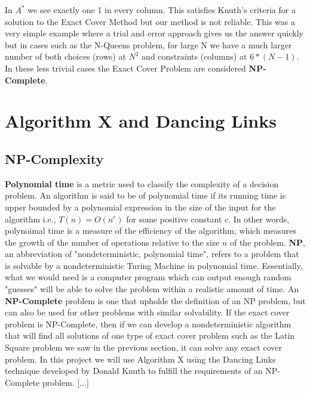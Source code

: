 \documentclass{article}
\begin{document}
In $A^*$ we see exactly one 1 in every column. This satisfies Knuth's criteria for a solution to the Exact Cover Method but our method is not reliable. This was a very simple example where a trial and error approach gives us the answer quickly but in cases such as the N-Queens problem, for large N we have a much larger number of both choices (rows) at $N^2$ and constraints (columns) at $6*(N-1)$. In these less trivial cases the Exact Cover Problem are considered \textbf{NP-Complete}.\\

\clearpage
\section{Algorithm X and Dancing Links}
\subsection{NP-Complexity}
\textbf{Polynomial time} is a metric used to classify the complexity of a decision problem. An algorithm is said to be of polynomial time if its running time is upper bounded by a polynomial expression in the size of the input for the algorithm i.e., $T(n) = O(n^c)$ for some positive constant $c$. In other words, polynoimal time is a measure of the efficiency of the algorithm, which measures the growth of the number of operations relative to the size $n$ of the problem. \textbf{NP}, an abbreviation of "nondeterministic, polynomial time", refers to a problem that is solvable by a nondeterministic Turing Machine in polynomial time. Essentially, what we would need is a computer program which can output enough random "guesses" will be able to solve the problem within a realistic amount of time. An \textbf{NP-Complete} problem is one that upholds the definition of an NP problem, but can also be used for other problems with similar solvability. If the exact cover problem is NP-Complete, then if we can develop a nondeterministic algorithm that will find all solutions of one type of exact cover problem such as the Latin Square problem we saw in the previous section, it can solve any exact cover problem. In this project we will use Algorithm X using the Dancing Links technique developed by Donald Knuth to fulfill the requirements of an NP-Complete problem. %
[...] \\
\end{document}
